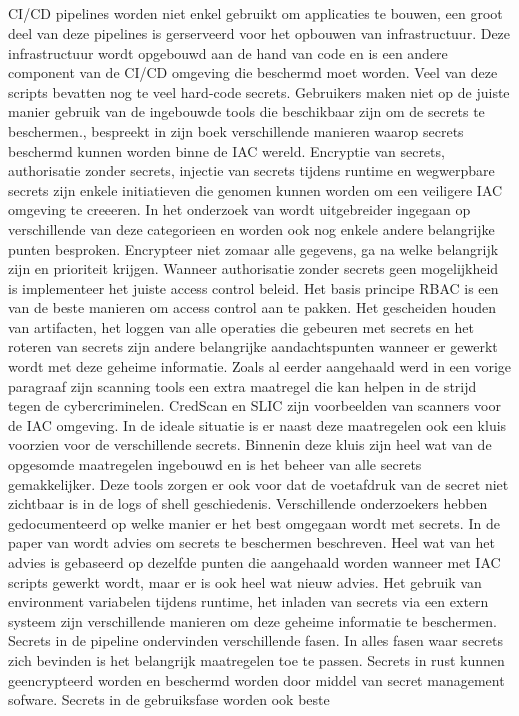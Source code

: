 \subsection{}%
\label{sec:Secrets in infrastructure as code en secrets beheer}
CI/CD pipelines worden niet enkel gebruikt om applicaties te bouwen, een groot deel van deze pipelines is gerserveerd voor het opbouwen van infrastructuur. Deze infrastructuur wordt opgebouwd aan de hand van code en is een andere component van de CI/CD omgeving die beschermd moet worden. Veel van deze scripts bevatten nog te veel hard-code secrets. Gebruikers maken niet op de juiste manier gebruik van de ingebouwde tools die beschikbaar zijn om de secrets te beschermen.\autocite{Rahman2019},\autocite{Kumara2021} \textcite{Morris2021} bespreekt in zijn boek verschillende manieren waarop secrets beschermd kunnen worden binne de IAC wereld. Encryptie van secrets, authorisatie zonder secrets, injectie van secrets tijdens runtime en wegwerpbare secrets zijn enkele initiatieven die genomen kunnen worden om een veiligere IAC omgeving te creeeren. In het onderzoek van \textcite{Rahman2021} wordt uitgebreider ingegaan op verschillende van deze categorieen en worden ook nog enkele andere belangrijke punten besproken. Encrypteer niet zomaar alle gegevens, ga na welke belangrijk zijn en prioriteit krijgen. Wanneer authorisatie zonder secrets geen mogelijkheid is implementeer het juiste access control beleid. Het basis principe RBAC is een van de beste manieren om access control aan te pakken. Het gescheiden houden van artifacten, het loggen van alle operaties die gebeuren met secrets en het roteren van secrets zijn andere belangrijke aandachtspunten wanneer er gewerkt wordt met deze geheime informatie. Zoals al eerder aangehaald werd in een vorige paragraaf zijn scanning tools een extra maatregel die kan helpen in de strijd tegen de cybercriminelen. CredScan en SLIC zijn voorbeelden van scanners voor de IAC omgeving. In de ideale situatie is er naast deze maatregelen ook een kluis voorzien voor de verschillende secrets. Binnenin deze kluis zijn heel wat van de opgesomde maatregelen ingebouwd en is het beheer van alle secrets gemakkelijker. Deze tools zorgen er ook voor dat de voetafdruk van de secret niet zichtbaar is in de logs of shell geschiedenis.\autocite{Agarwal2021} Verschillende onderzoekers hebben gedocumenteerd op welke manier er het best omgegaan wordt met secrets. In de paper van \autocite{Basak2023} wordt advies om secrets te beschermen beschreven. Heel wat van het advies is gebaseerd op dezelfde punten die aangehaald worden wanneer met IAC scripts gewerkt wordt, maar er is ook heel wat nieuw advies. Het gebruik van environment variabelen tijdens runtime, het inladen van secrets via een extern systeem zijn verschillende manieren om deze geheime informatie te beschermen. Secrets in de pipeline ondervinden verschillende fasen. In alles fasen waar secrets zich bevinden is het belangrijk maatregelen toe te passen. Secrets in rust kunnen geencrypteerd worden en beschermd worden door middel van secret management sofware. Secrets in de gebruiksfase worden ook beste 
